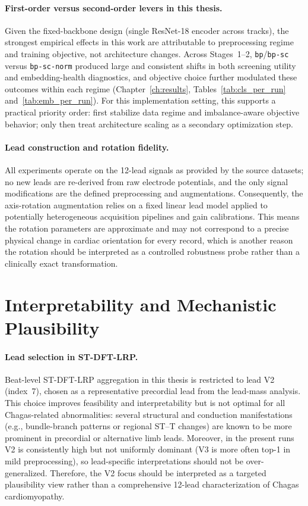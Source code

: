 \paragraph{First-order versus second-order levers in this thesis.}
Given the fixed-backbone design (single ResNet-18 encoder across tracks), the strongest empirical effects in this work are attributable to preprocessing regime and training objective, not architecture changes.
Across Stages~1--2, \texttt{bp}/\texttt{bp-sc} versus \texttt{bp-sc-norm} produced large and consistent shifts in both screening utility and embedding-health diagnostics, and objective choice further modulated these outcomes within each regime (Chapter~\ref{ch:results}, Tables~\ref{tab:cls_per_run} and~\ref{tab:emb_per_run}).
For this implementation setting, this supports a practical priority order: first stabilize data regime and imbalance-aware objective behavior; only then treat architecture scaling as a secondary optimization step.

\paragraph{Lead construction and rotation fidelity.}
All experiments operate on the 12-lead signals as provided by the source datasets; no new leads are re-derived from raw electrode potentials, and the only signal modifications are the defined preprocessing and augmentations.
Consequently, the axis-rotation augmentation relies on a fixed linear lead model applied to potentially heterogeneous acquisition pipelines and gain calibrations.
This means the rotation parameters are approximate and may not correspond to a precise physical change in cardiac orientation for every record, which is another reason the rotation should be interpreted as a controlled robustness probe rather than a clinically exact transformation.

\section{Interpretability and Mechanistic Plausibility}

\paragraph{Lead selection in ST-DFT-LRP.}
Beat-level ST-DFT-LRP aggregation in this thesis is restricted to lead V2 (index~7), chosen as a representative precordial lead from the lead-mass analysis.
This choice improves feasibility and interpretability but is not optimal for all Chagas-related abnormalities: several structural and conduction manifestations (e.g., bundle-branch patterns or regional ST--T changes) are known to be more prominent in precordial or alternative limb leads.
Moreover, in the present runs V2 is consistently high but not uniformly dominant (V3 is more often top-1 in mild preprocessing), so lead-specific interpretations should not be over-generalized.
Therefore, the V2 focus should be interpreted as a targeted plausibility view rather than a comprehensive 12-lead characterization of Chagas cardiomyopathy.

